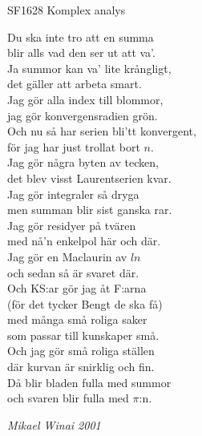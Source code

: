 \documentclass[a6paper,10pt]{article}
\begin{document}
\setlength{\oddsidemargin}{-0.47in}
\noindent
\begin{center}
\footnotesize SF1628 Komplex analys\\
\end{center}
Du ska inte tro att en summa \\
blir alls vad den ser ut att va'. \\
Ja summor kan va' lite krångligt, \\
det gäller att arbeta smart. 
\vspace{5pt} \\
Jag gör alla index till blommor, \\
jag gör konvergensradien grön. \\
Och nu så har serien bli'tt konvergent, \\
för jag har just trollat bort $n$. 
\vspace{5pt} \\
Jag gör några byten av tecken, \\
det blev visst Laurentserien kvar. \\
Jag gör integraler så dryga \\
men summan blir sist ganska rar. 
\vspace{5pt} \\
Jag gör residyer på tvären \\
med nå'n enkelpol här och där. \\
Jag gör en Maclaurin av $ln$ \\
och sedan så är svaret där. 
\vspace{5pt} \\
Och KS:ar gör jag åt F:arna \\
(för det tycker Bengt de ska få) \\
med många små roliga saker \\
som passar till kunskaper små. 
\vspace{5pt} \\
Och jag gör små roliga ställen \\
där kurvan är snirklig och fin. \\
Då blir bladen fulla med summor \\
och svaren blir fulla med $\pi$:n.
\begin{flushright}
\textit{Mikael Winai 2001}
\end{flushright}
\end{document}
